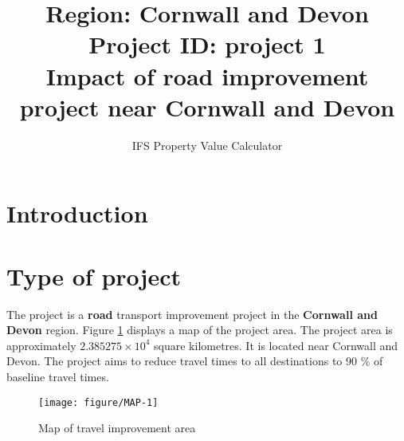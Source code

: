 \documentclass{article}\usepackage[]{graphicx}\usepackage[]{color}
\title{Region:   Cornwall and Devon \\
       Project ID:   project 1 \\
       Impact of road improvement project near Cornwall and Devon }
\author{IFS Property Value Calculator}
\date{}
\newenvironment{knitrout}{}{} %
\begin{document}
\maketitle

\section{Introduction}

\section{Type of project}
The project is a \textbf{road} transport improvement project in the 
\textbf{Cornwall and Devon} region. Figure \ref{fig:MAP} displays a map of the project area.
The project area is approximately \ensuremath{2.385275\times 10^{4}} square kilometres. It is located near
Cornwall and Devon. The project aims to reduce travel times to all destinations to 90
\% of baseline travel times.

\begin{knitrout}\scriptsize
{}\color{fgcolor}\begin{figure}[H]

{\centering \texttt{[image: figure/MAP-1]} 

}

\caption[Map of travel improvement area]{Map of travel improvement area}\label{fig:MAP}
\end{figure}


\end{knitrout}
\end{document}
